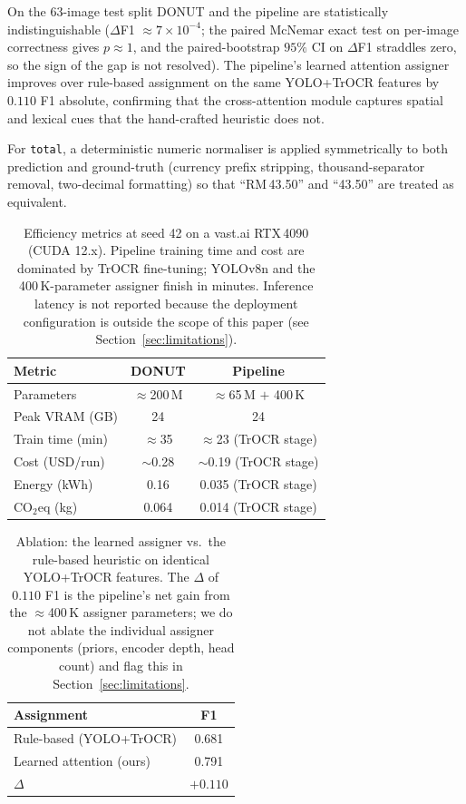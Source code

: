 \documentclass[conference]{IEEEtran}
\begin{document}
On the 63-image test split DONUT and the pipeline are
statistically indistinguishable ($\Delta$F1 $\approx 7\!\times\!10^{-4}$;
the paired McNemar exact test on per-image correctness gives
$p\!\approx\!1$, and the paired-bootstrap $95\%$ CI on $\Delta$F1
straddles zero, so the sign of the gap is not resolved).  The
pipeline's learned attention assigner improves over rule-based
assignment on the same YOLO+TrOCR features by $0.110$ F1 absolute,
confirming that the cross-attention module captures spatial and
lexical cues that the hand-crafted heuristic does not.

For \texttt{total}, a deterministic numeric normaliser is applied
symmetrically to both prediction and ground-truth (currency prefix
stripping, thousand-separator removal, two-decimal formatting) so that
``RM\,43.50'' and ``43.50'' are treated as equivalent.

\begin{table}[!t]
\centering
\caption{Efficiency metrics at seed 42 on a vast.ai RTX\,4090
         (CUDA 12.x).  Pipeline training time and cost are dominated
         by TrOCR fine-tuning; YOLOv8n and the 400\,K-parameter
         assigner finish in minutes.  Inference latency is not
         reported because the deployment configuration is outside
         the scope of this paper (see Section~\ref{sec:limitations}).}
\label{tab:efficiency}
\begin{tabular}{lcc}
\toprule
Metric & DONUT & Pipeline \\ \midrule
Parameters      & $\approx$200\,M & $\approx$65\,M $+$ 400\,K \\
Peak VRAM (GB)  & 24   & 24 \\
Train time (min)& $\approx$35 & $\approx$23 (TrOCR stage) \\
Cost (USD/run)  & $\sim$0.28 & $\sim$0.19 (TrOCR stage) \\
Energy (kWh)    & 0.16 & 0.035 (TrOCR stage) \\
CO$_2$eq (kg)   & 0.064 & 0.014 (TrOCR stage) \\
\bottomrule
\end{tabular}
\end{table}

\begin{table}[!t]
\centering
\caption{Ablation: the learned assigner vs.\ the rule-based
         heuristic on identical YOLO+TrOCR features.  The $\Delta$
         of $0.110$ F1 is the pipeline's net gain from the
         $\approx$400\,K assigner parameters; we do not ablate the
         individual assigner components (priors, encoder depth,
         head count) and flag this in
         Section~\ref{sec:limitations}.}
\label{tab:ablation}
\begin{tabular}{lc}
\toprule
Assignment & F1 \\ \midrule
Rule-based (YOLO+TrOCR) & 0.681 \\
Learned attention (ours) & 0.791 \\
$\Delta$ & $+0.110$ \\
\bottomrule
\end{tabular}
\end{table}
\end{document}
